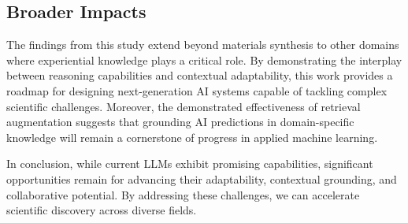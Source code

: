 \subsection{Broader Impacts}
The findings from this study extend beyond materials synthesis to other domains where experiential knowledge plays a critical role. By demonstrating the interplay between reasoning capabilities and contextual adaptability, this work provides a roadmap for designing next-generation AI systems capable of tackling complex scientific challenges. Moreover, the demonstrated effectiveness of retrieval augmentation suggests that grounding AI predictions in domain-specific knowledge will remain a cornerstone of progress in applied machine learning.

In conclusion, while current LLMs exhibit promising capabilities, significant opportunities remain for advancing their adaptability, contextual grounding, and collaborative potential. By addressing these challenges, we can accelerate scientific discovery across diverse fields.
